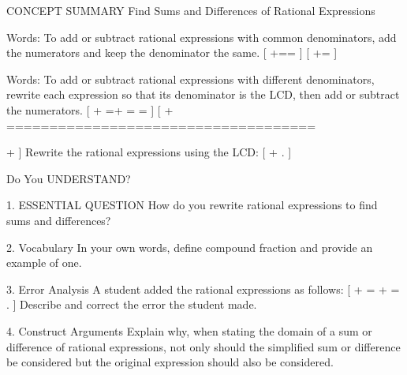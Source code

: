 \documentclass{article}
\newenvironment{concept-summary}{}{}
\newcommand{\answer}[1]{}
\begin{document}
\begin{concept-summary}
CONCEPT SUMMARY Find Sums and Differences of Rational Expressions

Words: To add or subtract rational expressions with common denominators, add the numerators and keep the denominator the same.
[
+==
]
[
+=
]

Words: To add or subtract rational expressions with different denominators, rewrite each expression so that its denominator is the LCD, then add or subtract the numerators.
[
+
=+
=
=
]
[
+
====================================

+
]
Rewrite the rational expressions using the LCD:
[
+
.
]

Do You UNDERSTAND?

1. ESSENTIAL QUESTION How do you rewrite rational expressions to find sums and differences?
   \answer{Find a common denominator, add or subtract the numerators, and simplify, eliminating common factor(s) shared by both the numerator and denominator of the sum or difference.}

2. Vocabulary In your own words, define compound fraction and provide an example of one.
   \answer{A compound fraction is a fraction that has one or more fractions in the numerator and/or denominator. Example: (\frac{\frac{1}{2x}}{x+y}).}

3. Error Analysis A student added the rational expressions as follows:
   [
   +
   =
   +
   =
   .
   ]
   Describe and correct the error the student made.
   \answer{The student incorrectly used the polynomial expression (x+7) as the common denominator, when (x(x+7)) should have been used. The correct method is (\frac{5x}{x+7}+\frac{7}{x}=\frac{5x(x)}{x(x+7)}+\frac{7(x+7)}{x(x+7)}=\frac{5x^2+7x+49}{x(x+7)}).}

4. Construct Arguments Explain why, when stating the domain of a sum or difference of rational expressions, not only should the simplified sum or difference be considered but the original expression should also be considered.
   \answer{The simplified sum or difference may not include some values of the domain that were eliminated during the simplification process.}


\end{concept-summary}
\end{document}

